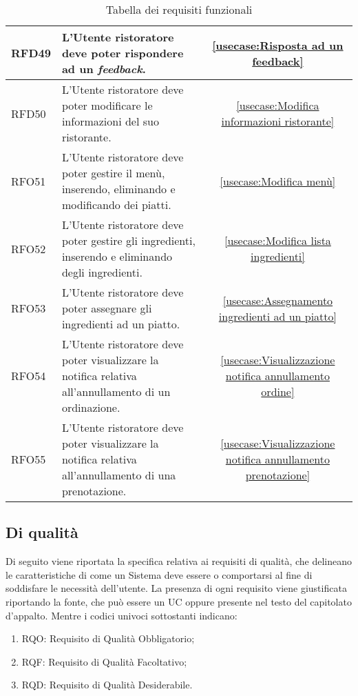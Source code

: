 \begin{table}[H]
\begin{tabularx}{\textwidth}{l|X|c}
		\hline
		RFD49       & L'Utente ristoratore deve poter rispondere ad un \textit{feedback}.                                                              & \autoref{usecase:Risposta ad un feedback}            \\
		\hline
		RFD50       & L'Utente ristoratore deve poter modificare le informazioni del suo ristorante.                                          & \autoref{usecase:Modifica informazioni ristorante}   \\
		\hline
		RFO51       & L'Utente ristoratore deve poter gestire il menù, inserendo, eliminando e modificando dei piatti.                        & \autoref{usecase:Modifica menù}                      \\
		\hline
		RFO52       & L'Utente ristoratore deve poter gestire gli ingredienti, inserendo e eliminando degli ingredienti.                      & \autoref{usecase:Modifica lista ingredienti}         \\
		\hline
		RFO53       & L'Utente ristoratore deve poter assegnare gli ingredienti ad un piatto.                      							  & \autoref{usecase:Assegnamento ingredienti ad un piatto}         \\
		\hline
		RFO54       & L'Utente ristoratore deve poter visualizzare la notifica relativa all'annullamento di un ordinazione.                   & \autoref{usecase:Visualizzazione notifica annullamento ordine}         \\
		\hline
		RFO55       & L'Utente ristoratore deve poter visualizzare la notifica relativa all'annullamento di una prenotazione.                  & \autoref{usecase:Visualizzazione notifica annullamento prenotazione}         \\
	\end{tabularx}
	\caption{Tabella dei requisiti funzionali}
\end{table}


\subsection{Di qualità}

Di seguito viene riportata la specifica relativa ai requisiti di qualità, che delineano le caratteristiche di come un Sistema
deve essere o comportarsi al fine di soddisfare le necessità dell'utente.
La presenza di ogni requisito viene giustificata riportando la fonte, che può essere un UC oppure presente
nel testo del capitolato d'appalto. Mentre i codici univoci sottostanti indicano:
\begin{enumerate}
	\item RQO: Requisito di Qualità Obbligatorio;
	\item RQF: Requisito di Qualità Facoltativo;
	\item RQD: Requisito di Qualità Desiderabile.
\end{enumerate}

